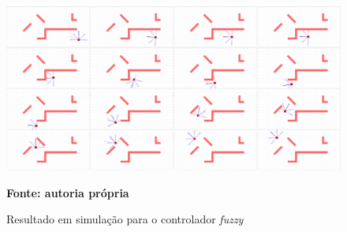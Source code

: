 \begin{figure}[ht]
\centering
\caption{Resultado em simulação para o controlador \textit{fuzzy}}
\label{fig:resultadoSimulacaoFuzzy}
		\centering
		\includegraphics[clip, 
scale=0.29]{Figuras/simulacao_fuzzyCompactado}

	\textbf{Fonte: autoria própria}
\end{figure}